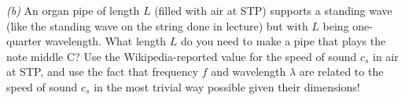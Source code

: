 \documentclass[12pt]{article}
\begin{document}
\textsl{(b)} An organ pipe of length $L$ (filled with air at STP)
supports a standing wave (like the standing wave on the string done in
lecture) but with $L$ being one-quarter wavelength.  What length $L$
do you need to make a pipe that plays the note middle C?  Use the
Wikipedia-reported value for the speed of sound $c_s$ in air at STP,
and use the fact that frequency $f$ and wavelength $\lambda$ are
related to the speed of sound $c_s$ in the most trivial way possible
given their dimensions!
\end{document}
